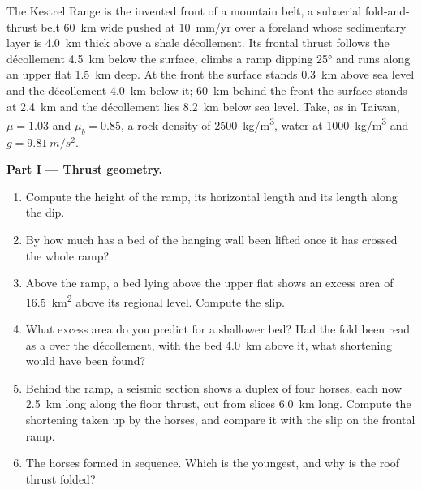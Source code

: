 \begin{problem}
\label{pb:b3:orogenic-wedges:1}
The Kestrel Range is the invented front of a mountain belt, a subaerial
fold-and-thrust belt \qty{60}{km} wide pushed at \qty{10}{mm/yr} over a
foreland whose sedimentary layer is \qty{4.0}{km} thick above a shale
décollement. Its frontal thrust follows the décollement \qty{4.5}{km} below
the surface, climbs a ramp dipping \ang{25} and runs along an upper flat
\qty{1.5}{km} deep. At the front the surface stands \qty{0.3}{km} above sea
level and the décollement \qty{4.0}{km} below it; \qty{60}{km} behind the
front the surface stands at \qty{2.4}{km} and the décollement lies
\qty{8.2}{km} below sea level. Take, as in Taiwan, $\mu = 1.03$ and $\mu_b =
0.85$, a rock density of \qty{2500}{kg/m^3}, water at \qty{1000}{kg/m^3} and
$g = \qty{9.81}{m/s^2}$.

\medskip\noindent\textbf{Part I --- Thrust geometry.}
\begin{enumerate}
  \item Compute the height of the ramp, its horizontal length and its length
        along the dip.
  \item By how much has a bed of the hanging wall been lifted once it has
        crossed the whole ramp?
  \item Above the ramp, a bed lying above the upper flat shows an excess area
        of \qty{16.5}{km^2} above its regional level. Compute the slip.
  \item What excess area do you predict for a shallower bed? Had the fold been
        read as a  over the décollement, with the bed
        \qty{4.0}{km} above it, what shortening would have been found?
  \item Behind the ramp, a seismic section shows a duplex of four horses, each
        now \qty{2.5}{km} long along the floor thrust, cut from slices
        \qty{6.0}{km} long. Compute the shortening taken up by the horses, and
        compare it with the slip on the frontal ramp.
  \item The horses formed in sequence. Which is the youngest, and why is the
        roof thrust folded?
\end{enumerate}


\end{problem}
